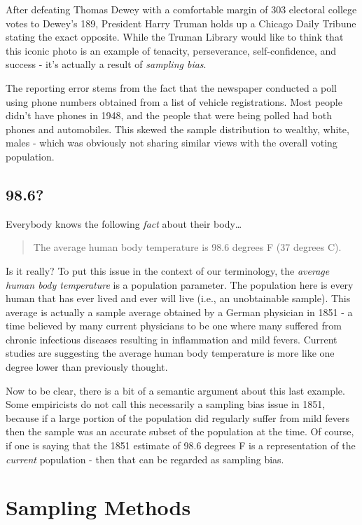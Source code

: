 \documentclass[
]{book}
\begin{document}
After defeating Thomas Dewey with a comfortable margin of 303 electoral college votes to Dewey's 189, President Harry Truman holds up a Chicago Daily Tribune stating the exact opposite. While the Truman Library would like to think that this iconic photo is an example of tenacity, perseverance, self-confidence, and success - it's actually a result of \emph{sampling bias}.

The reporting error stems from the fact that the newspaper conducted a poll using phone numbers obtained from a list of vehicle registrations. Most people didn't have phones in 1948, and the people that were being polled had both phones and automobiles. This skewed the sample distribution to wealthy, white, males - which was obviously not sharing similar views with the overall voting population.

\hypertarget{section-1}{%
\subsection{98.6?}\label{section-1}}

Everybody knows the following \emph{fact} about their body\ldots{}

\begin{quote}
The average human body temperature is 98.6 degrees F (37 degrees C).
\end{quote}

Is it really? To put this issue in the context of our terminology, the \emph{average human body temperature} is a population parameter. The population here is every human that has ever lived and ever will live (i.e., an unobtainable sample). This average is actually a sample average obtained by a German physician in 1851 - a time believed by many current physicians to be one where many suffered from chronic infectious diseases resulting in inflammation and mild fevers. Current studies are suggesting the average human body temperature is more like one degree lower than previously thought.

Now to be clear, there is a bit of a semantic argument about this last example. Some empiricists do not call this necessarily a sampling bias issue in 1851, because if a large portion of the population did regularly suffer from mild fevers then the sample was an accurate subset of the population at the time. Of course, if one is saying that the 1851 estimate of 98.6 degrees F is a representation of the \emph{current} population - then that can be regarded as sampling bias.

\hypertarget{sampling-methods}{%
\section{Sampling Methods}\label{sampling-methods}}
\end{document}
